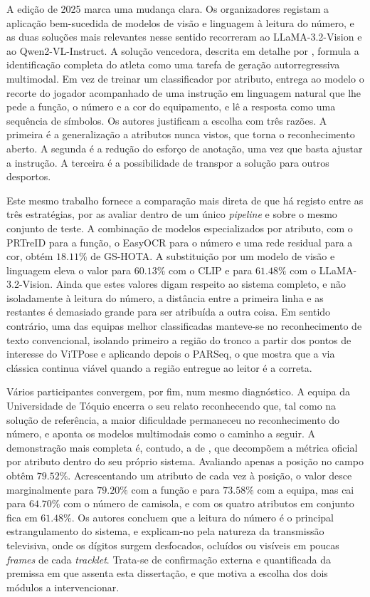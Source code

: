 A edição de 2025 marca uma mudança clara. Os organizadores registam a aplicação bem-sucedida de modelos de visão e linguagem à leitura do número, e as duas soluções mais relevantes nesse sentido recorreram ao LLaMA-3.2-Vision e ao Qwen2-VL-Instruct. A solução vencedora, descrita em detalhe por \citet{oo2026broadcast2pitch}, formula a identificação completa do atleta como uma tarefa de geração autorregressiva multimodal. Em vez de treinar um classificador por atributo, entrega ao modelo o recorte do jogador acompanhado de uma instrução em linguagem natural que lhe pede a função, o número e a cor do equipamento, e lê a resposta como uma sequência de símbolos. Os autores justificam a escolha com três razões. A primeira é a generalização a atributos nunca vistos, que torna o reconhecimento aberto. A segunda é a redução do esforço de anotação, uma vez que basta ajustar a instrução. A terceira é a possibilidade de transpor a solução para outros desportos.

Este mesmo trabalho fornece a comparação mais direta de que há registo entre as três estratégias, por as avaliar dentro de um único \emph{pipeline} e sobre o mesmo conjunto de teste. A combinação de modelos especializados por atributo, com o PRTreID para a função, o EasyOCR para o número e uma rede residual para a cor, obtém $18{.}11\%$ de GS-HOTA. A substituição por um modelo de visão e linguagem eleva o valor para $60{.}13\%$ com o CLIP e para $61{.}48\%$ com o LLaMA-3.2-Vision. Ainda que estes valores digam respeito ao sistema completo, e não isoladamente à leitura do número, a distância entre a primeira linha e as restantes é demasiado grande para ser atribuída a outra coisa. Em sentido contrário, uma das equipas melhor classificadas manteve-se no reconhecimento de texto convencional, isolando primeiro a região do tronco a partir dos pontos de interesse do ViTPose e aplicando depois o PARSeq, o que mostra que a via clássica continua viável quando a região entregue ao leitor é a correta.

Vários participantes convergem, por fim, num mesmo diagnóstico. A equipa da Universidade de Tóquio encerra o seu relato reconhecendo que, tal como na solução de referência, a maior dificuldade permaneceu no reconhecimento do número, e aponta os modelos multimodais como o caminho a seguir. A demonstração mais completa é, contudo, a de \citet{oo2026broadcast2pitch}, que decompõem a métrica oficial por atributo dentro do seu próprio sistema. Avaliando apenas a posição no campo obtêm $79{.}52\%$. Acrescentando um atributo de cada vez à posição, o valor desce marginalmente para $79{.}20\%$ com a função e para $73{.}58\%$ com a equipa, mas cai para $64{.}70\%$ com o número de camisola, e com os quatro atributos em conjunto fica em $61{.}48\%$. Os autores concluem que a leitura do número é o principal estrangulamento do sistema, e explicam-no pela natureza da transmissão televisiva, onde os dígitos surgem desfocados, ocluídos ou visíveis em poucas \emph{frames} de cada \emph{tracklet}. Trata-se de confirmação externa e quantificada da premissa em que assenta esta dissertação, e que motiva a escolha dos dois módulos a intervencionar.

